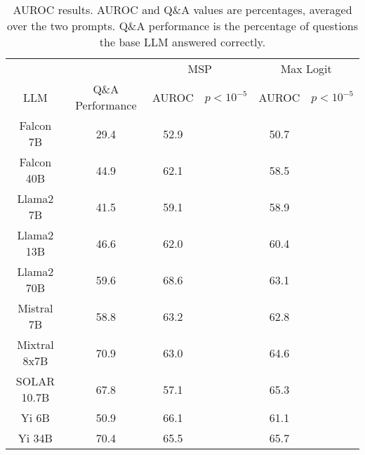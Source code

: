 \begin{table*}
\centering
\begin{tabular}{c|c|c|c|c|c}
& & \multicolumn{2}{c|}{MSP} & \multicolumn{2}{c}{Max Logit} \\ 
LLM & Q\&A Performance & AUROC & $p < 10^{-5}$ & AUROC & $p < 10^{-5}$\\ \hline
Falcon 7B & 29.4 & 52.9 &  & 50.7 & \\
Falcon 40B & 44.9 & 62.1 &  & 58.5 & \\
Llama2 7B & 41.5 & 59.1 &  & 58.9 & \\
Llama2 13B & 46.6 & 62.0 &  & 60.4 & \\
Llama2 70B & 59.6 & 68.6 &  & 63.1 & \\
Mistral 7B & 58.8 & 63.2 &  & 62.8 & \\
Mixtral 8x7B & 70.9 & 63.0 &  & 64.6 & \\
SOLAR 10.7B & 67.8 & 57.1 &  & 65.3 & \\
Yi 6B & 50.9 & 66.1 &  & 61.1 & \\
Yi 34B & 70.4 & 65.5 &  & 65.7 & \\
\hline
\end{tabular}
\caption{AUROC results. AUROC and Q\&A values are percentages, averaged over the two prompts. Q\&A performance is the percentage of questions the base LLM answered correctly.}
\label{tab:auroc}
\end{table*}
